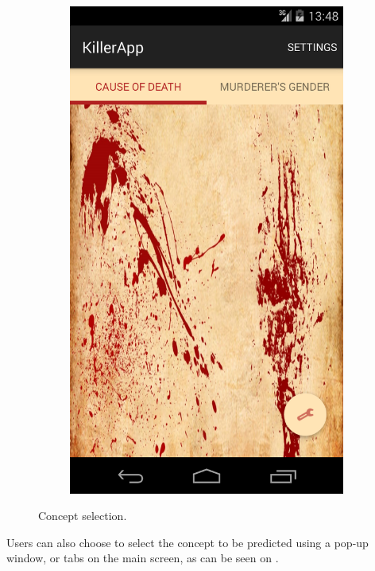 \documentclass{mproj}
\begin{document}
\begin{figure}[h]
\begin{subfigure}{0.25\textwidth}
		\includegraphics[width=\textwidth]{images/class_tabs}
	\end{subfigure}			
	\caption{Concept selection.}
	\label{fig:concept_selection}
\end{figure}

Users can also choose to select the concept to be predicted using a pop-up window, or tabs on the main screen, as can be seen on .
\end{document}
